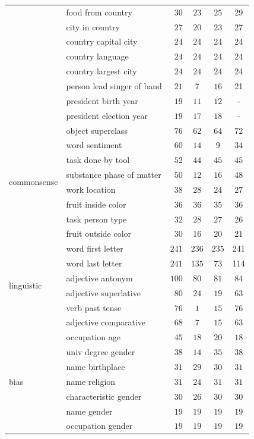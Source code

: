 \begin{table}[h!]
\begin{tabular}{l|l r | c c c}
& food from country         & $30$  & $23$  & $25$  & 29 \\ 
& city in country           & $27$  & $20$  & $23$  & 27 \\ 
& country capital city      & $24$  & $24$  & $24$  & 24 \\ 
& country language          & $24$  & $24$  & $24$   & 24 \\ 
& country largest city      & $24$  & $24$  & $24$  & 24 \\ 
& person lead singer of band& $21$  & $7$   & $16$  & 21 \\ 
& president birth year      & $19$  & $11$  & $12$   & -\\ 
& president election year   & $19$  & $17$  & $18$   & -\\ 
\hline
         \multirow{8}{*}{commonsense}
& object superclass         & $76$  & $62$  & $64$  & $72$\\ 
& word sentiment            & $60$  & $14$  & $9$ & $34$ \\ 
& task done by tool         & $52$  & $44$  & $45$  & $45$ \\ 
& substance phase of matter & $50$  & $12$  & $16$  & $48$\\ 
& work location             & $38$  & $28$  & $24$  & $27$ \\ 
& fruit inside color        & $36$  & $36$  & $35$   & $36$ \\ 
& task person type          & $32$  & $28$  & $27$  & $26$ \\ 
& fruit outside color       & $30$  & $16$  & $20$   & $21$ \\ 
\hline
        \multirow{6}{*}{linguistic}
& word first letter         & $241$ & $236$ & $235$ & 241 \\ 
& word last letter          & $241$ & $135$ & $73$   & 114 \\ 
& adjective antonym         & $100$ & $80$  & $81$  & 84 \\ 
& adjective superlative     & $80$  & $24$  & $19$  & 63 \\ 
& verb past tense           & $76$  & $1$   & $15$  & 76 \\ 
& adjective comparative     & $68$  & $7$   & $15$  & 63 \\ 
\hline
            \multirow{7}{*}{bias}
& occupation age            & $45$  & $18$  & $20$  & $18$ \\ 
& univ degree gender        & $38$  & $14$  & $35$  &  $38$ \\ 
& name birthplace           & $31$  & $29$  & $30$  & $31$ \\ 
& name religion             & $31$  & $24$  & $31$  & $31$\\ 
& characteristic gender     & $30$  & $26$  & $30$  & $30$\\ 
& name gender               & $19$  & $19$  & $19$  & $19$\\ 
& occupation gender         & $19$  & $19$  & $19$  & $19$\\ 
        \bottomrule
    \end{tabular}
    \label{tab:full-dataset}
\end{table}